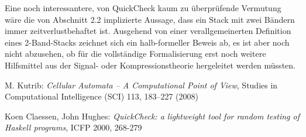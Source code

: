 \documentclass{article}
\begin{document}
Eine noch interessantere, von QuickCheck kaum zu überprüfende Vermutung wäre die von Abschnitt 2.2 implizierte Aussage, dass ein Stack mit zwei Bändern immer zeitverlustbehaftet ist. Ausgehend von einer verallgemeinerten Definition eines 2-Band-Stacks zeichnet sich ein halb-formeller Beweis ab, es ist aber noch nicht abzusehen, ob für die vollständige Formalisierung erst noch weitere Hilfsmittel aus der Signal- oder Kompressionstheorie hergeleitet werden müssten.
\newpage
\begin{thebibliography}{9}
        M. Kutrib: \emph{Cellular Automata – A Computational Point of View}, Studies in Computational Intelligence (SCI) 113, 183–227 (2008)

        Koen Claessen, John Hughes: \emph{QuickCheck: a lightweight tool for random testing of Haskell programs}, ICFP 2000, 268-279
\end{thebibliography}
\end{document}
